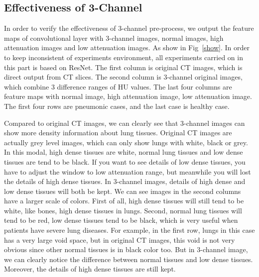 \documentclass[runningheads]{llncs}
\begin{document}
\subsection{Effectiveness of 3-Channel}
\label{effectiveness}
In order to verify the effectiveness of 3-channel pre-process, we output the feature maps of convolutional layer with 3-channel images, normal images, high attenuation images and low attenuation images. As show in Fig~\ref{show}. In order to keep inconsistent of experiments environment, all experiments carried on in this part is based on ResNet. The first column is original CT images, which is direct output from CT slices. The second column is 3-channel original images, which combine 3 difference ranges of HU values. The last four columns are feature maps with normal image, high attenuation image, low attenuation image. The first four rows are pneumonic cases, and the last case is healthy case.

Compared to original CT images, we can clearly see that 3-channel images can show more density information about lung tissues. Original CT images are actually grey level images, which can only show lungs with white, black or grey. In this modal, high dense tissues are white, normal lung tissues and low dense tissues are tend to be black. If you want to see details of low dense tissues, you have to adjust the window to low attenuation range, but meanwhile you will lost the details of high dense tissues. In 3-channel images, details of high dense and low dense tissues will both be kept. We can see images in the second columns have a larger scale of colors. First of all, high dense tissues will still tend to be white, like bones, high dense tissues in lungs. Second, normal lung tissues will tend to be red, low dense tissues tend to be black, which is very useful when patients have severe lung diseases. For example, in the first row, lungs in this case has a very large void space, but in original CT images, this void is not very obvious since other normal tissues is in black color too. But in 3-channel image, we can clearly notice the difference between normal tissues and low dense tissues. Moreover, the details of high dense tissues are still kept.
\end{document}
